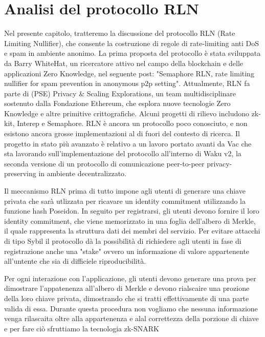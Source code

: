 \chapter{Analisi del protocollo RLN}
\label{chap:rln-protocol}

Nel presente capitolo, tratteremo la discussione del protocollo RLN (Rate Limiting Nullifier), che consente la
costruzione di regole di rate-limiting anti DoS e spam in ambiente anonimo. La prima proposta del protocollo è stata
sviluppata da Barry WhiteHat, un ricercatore attivo nel campo della blockchain e delle applicazioni Zero Knowledge, nel
seguente post: "Semaphore RLN, rate limiting nullifier for spam prevention in anonymous p2p setting". Attualmente, RLN
fa parte di (PSE) Privacy \& Scaling Explorations, un team multidisciplinare sostenuto dalla Fondazione Ethereum, che
esplora nuove tecnologie Zero Knowledge e altre primitive crittografiche. Alcuni progetti di rilievo includono zk-kit,
Interep e Semaphore. RLN è ancora un protocollo poco conosciuto, e non esistono ancora grosse implementazioni al di
fuori del contesto di ricerca. Il progetto in stato più avanzato è relativo a un lavoro portato avanti da Vac che sta
lavorando sull'implementazione del protocollo all'interno di Waku v2, la seconda versione di un protocollo di
comunicazione peer-to-peer privacy-preserving in ambiente decentralizzato.

Il meccanismo RLN prima di tutto impone agli utenti di generare una chiave privata che sarà utlizzata per ricavare un identity commitment utilizzando la funzione hash Poseidon. In seguito per registrarsi, gli utenti devono fornire il loro identity commitment, che viene memorizzato in una foglia dell'albero di Merkle, il quale rappresenta la struttura dati dei membri del servizio. Per evitare attacchi di tipo Sybil il protocollo dà la possibilità di richiedere agli utenti in fase di registrazione anche una "stake" ovvero un informazione di valore appartenente all'untente che sia di difficiele riproducibilità. 

Per ogni interazione con l'applicazione, gli utenti devono generare una prova per dimostrare l'appatenenza all'albero di Merkle e devono rialscaire una prozione della loro chiave privata, dimostrando che si tratti effettivamente di una parte valida di essa. Durante questa procedura non vogliamo che nessuna informazione venga rilascaita oltre alla appartenenza e alal correttezza della porzione di chiave e per fare ciò sfruttiamo la tecnologia zk-SNARK

